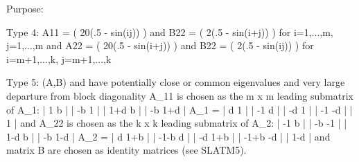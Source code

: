 \begin{DoxyParagraph}{Purpose\+: }
\begin{DoxyVerb}
 Type 4:  A11 = ( 20(.5 - sin(ij)) ) and B22 = ( 2(.5 - sin(i+j)) )
             for i=1,...,m,  j=1,...,m and
          A22 = ( 20(.5 - sin(i+j)) ) and B22 = ( 2(.5 - sin(ij)) )
             for i=m+1,...,k,  j=m+1,...,k

 Type 5:  (A,B) and have potentially close or common eigenvalues and
          very large departure from block diagonality A_11 is chosen
          as the m x m leading submatrix of A_1:
                  |  1  b                            |
                  | -b  1                            |
                  |        1+d  b                    |
                  |         -b 1+d                   |
           A_1 =  |                  d  1            |
                  |                 -1  d            |
                  |                        -d  1     |
                  |                        -1 -d     |
                  |                               1  |
          and A_22 is chosen as the k x k leading submatrix of A_2:
                  | -1  b                            |
                  | -b -1                            |
                  |       1-d  b                     |
                  |       -b  1-d                    |
           A_2 =  |                 d 1+b            |
                  |               -1-b d             |
                  |                       -d  1+b    |
                  |                      -1+b  -d    |
                  |                              1-d |
          and matrix B are chosen as identity matrices (see SLATM5).\end{DoxyVerb}
 
\end{DoxyParagraph}

